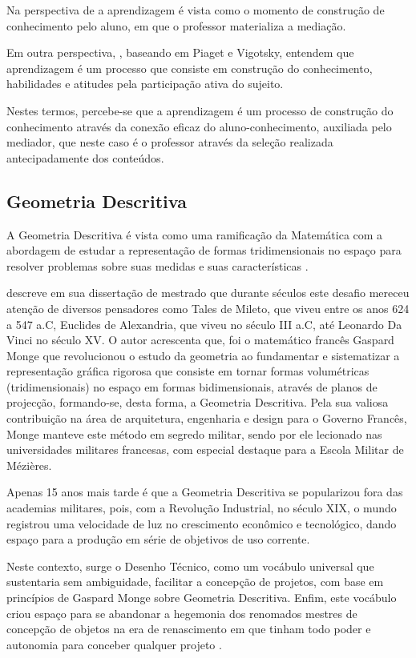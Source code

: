 \documentclass[portuguese]{textolivre}
\begin{document}
Na perspectiva de \textcite{almeida2011} a aprendizagem é vista como o momento de construção de conhecimento pelo aluno, em que o professor materializa a mediação.

Em outra perspectiva, \textcite{rueffer2022}, baseando em Piaget e Vigotsky, entendem que aprendizagem é um processo que consiste em construção do conhecimento, habilidades e atitudes pela participação ativa do sujeito.

Nestes termos, percebe-se que a aprendizagem é um processo de construção do conhecimento através da conexão eficaz do aluno-conhecimento, auxiliada pelo mediador, que neste caso é o professor através da seleção realizada antecipadamente dos conteúdos.

\subsection{Geometria Descritiva}
A Geometria Descritiva é vista como uma ramificação da Matemática com a abordagem de estudar a representação de formas tridimensionais no espaço para resolver problemas sobre suas medidas e suas características \cite{chitlango2023}.

\textcite{chitlango2023} descreve em sua dissertação de mestrado que durante séculos este desafio mereceu atenção de diversos pensadores como Tales de Mileto, que viveu entre os anos 624 a 547 a.C, Euclides de Alexandria, que viveu no século III a.C, até Leonardo Da Vinci no século XV. O autor acrescenta que, foi o matemático francês Gaspard Monge que revolucionou o estudo da geometria ao fundamentar e sistematizar a representação gráfica rigorosa que consiste em tornar formas volumétricas (tridimensionais) no espaço em formas bidimensionais, através de planos de projecção, formando-se, desta forma, a Geometria Descritiva. Pela sua valiosa contribuição na área de arquitetura, engenharia e design para o Governo Francês, Monge manteve este método em segredo militar, sendo por ele lecionado nas universidades militares francesas, com especial destaque para a Escola Militar de Mézières.

Apenas 15 anos mais tarde é que a Geometria Descritiva se popularizou fora das academias militares, pois, com a Revolução Industrial, no século XIX, o mundo registrou uma velocidade de luz no crescimento econômico e tecnológico, dando espaço para a produção em série de objetivos de uso corrente.

Neste contexto, surge o Desenho Técnico, como um vocábulo universal que sustentaria sem ambiguidade, facilitar a concepção de projetos, com base em princípios de Gaspard Monge sobre Geometria Descritiva. Enfim, este vocábulo criou espaço para se abandonar a hegemonia dos renomados mestres de concepção de objetos na era de renascimento em que tinham todo poder e autonomia para conceber qualquer projeto \cite{chitlango2023}.
\end{document}
